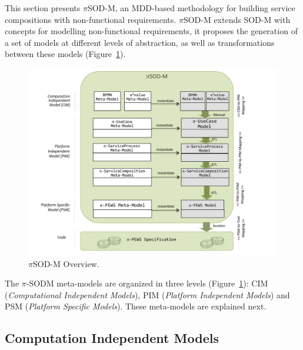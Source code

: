 
This section presents $\pi$SOD-M, an MDD-based methodology for building service compositions with non-functional requirements. 
$\pi$SOD-M extends SOD-M with concepts for modelling non-functional requirements, it proposes the generation of a set of models at different levels of abstraction, as well as transformations between these models (Figure~\ref{fig:piSOD-M}).
\begin{figure}[h]
\centering
\includegraphics[width=1.0\textwidth]{figs/piSOD-M_process.pdf}
\caption{$\pi$SOD-M Overview.}
\label{fig:piSOD-M}
\end{figure}

The $\pi$-SODM  meta-models are organized in three levels (Figure~\ref{fig:piSOD-M}): CIM (\textit{Computational Independent Models}), PIM (\textit{Platform Independent Models}) and PSM (\textit{Platform Specific Models}). 
These meta-models are explained next.

\subsection{Computation Independent Models}

